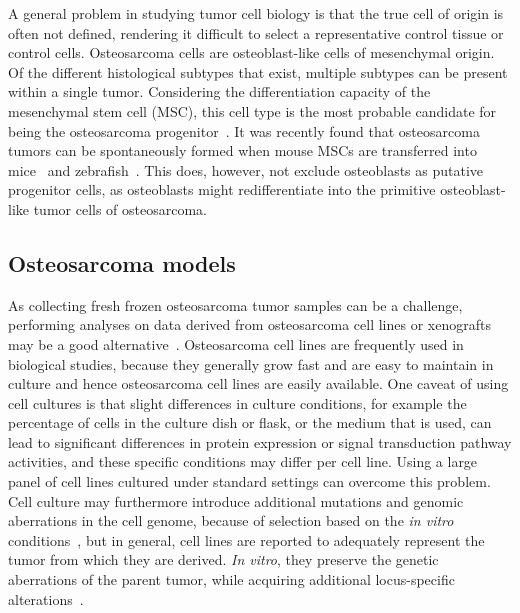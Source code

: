A general problem in studying tumor cell biology is that
the true cell of origin is often not defined, rendering it difficult
to select a representative control tissue or control cells.
Osteosarcoma cells are osteoblast\hyp{}like cells of mesenchymal
origin. Of the different histological subtypes that exist, multiple
subtypes can be present within a single tumor. Considering
the differentiation capacity of the mesenchymal stem cell
(MSC), this cell type is the most probable candidate for being
the osteosarcoma progenitor~\cite{mohseny2011concise,bovee2003skeletogenesis}. It was recently found that
osteosarcoma tumors can be spontaneously formed when
mouse MSCs are transferred into mice~\cite{tolar2006sarcoma,mohseny2009osteosarcoma} and zebrafish~\cite{mohseny2012osteosarcomazebrafish,mohseny2012osteosarcomamodels}.
This does, however, not exclude osteoblasts as putative progenitor
cells, as osteoblasts might redifferentiate into the
primitive osteoblast\hyp{}like tumor cells of osteosarcoma.

\subsection{Osteosarcoma models}
As collecting fresh frozen osteosarcoma tumor samples can
be a challenge, performing analyses on data derived from osteosarcoma
cell lines or xenografts may be a good alternative~\cite{mohseny2012osteosarcomamodels}. Osteosarcoma cell lines are frequently used in
biological studies, because they generally grow fast and are
easy to maintain in culture and hence osteosarcoma cell lines
are easily available. One caveat of using cell cultures is that
slight differences in culture conditions, for example the percentage
of cells in the culture dish or flask, or the medium
that is used, can lead to significant differences in protein
expression or signal transduction pathway activities, and
these specific conditions may differ per cell line. Using a
large panel of cell lines cultured under standard settings can
overcome this problem. Cell culture may furthermore
introduce additional mutations and genomic aberrations in
the cell genome, because of selection based on the {\it in vitro}
conditions~\cite{weinberg2007cells}, but in general, cell lines are reported to
adequately represent the tumor from which they are derived.
{\it In vitro}, they preserve the genetic aberrations of the parent
tumor, while acquiring additional locus\hyp{}specific alterations~\cite{greshock2007cancer}.

